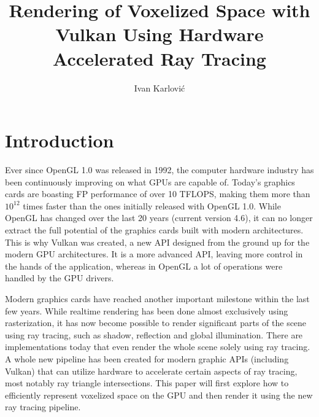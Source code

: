 \documentclass[times, utf8, zavrsni, numeric]{fer}
\begin{document}

\title{Rendering of Voxelized Space with Vulkan Using Hardware Accelerated Ray Tracing}

\author{Ivan Karlović}

\maketitle

\izvornik

\zahvala{}

\tableofcontents

\chapter{Introduction}

Ever since OpenGL 1.0 was released in 1992, the computer hardware industry has been continuously improving on what GPUs are capable of. Today's graphics cards are boasting FP performance of over 10 TFLOPS, making them more than $10^{12}$ times faster than the ones initially released with OpenGL 1.0. While OpenGL has changed over the last 20 years (current version 4.6), it can no longer extract the full potential of the graphics cards built with modern architectures. This is why Vulkan was created, a new API designed from the ground up for the modern GPU architectures. It is a more advanced API, leaving more control in the hands of the application, whereas in OpenGL a lot of operations were handled by the GPU drivers.

Modern graphics cards have reached another important milestone within the last few years. While realtime rendering has been done almost exclusively using rasterization, it has now become possible to render significant parts of the scene using ray tracing, such as shadow, reflection and global illumination. There are implementations today that even render the whole scene solely using ray tracing. A whole new pipeline has been created for modern graphic APIs (including Vulkan) that can utilize hardware to accelerate certain aspects of ray tracing, most notably ray triangle intersections. This paper will first explore how to efficiently represent voxelized space on the GPU and then render it using the new ray tracing pipeline.
\end{document}
